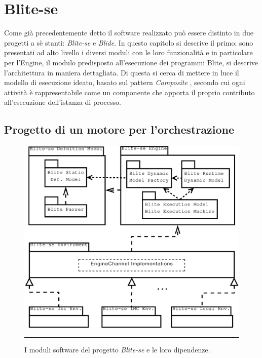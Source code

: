 \chapter{Blite-se}

Come già precedentemente detto il software realizzato può essere distinto
in due progetti a sè stanti: \emph{Blite-se} e \emph{Blide}. In questo capitolo
si descrive il primo; sono presentati ad alto livello i diversi
moduli con le loro funzionalità e in particolare per l'Engine, il modulo predisposto all'esecuzione dei programmi
Blite, si descrive l'architettura in maniera dettagliata. Di questa si cerca di
mettere in luce il modello di esecuzione ideato, basato sul pattern
\emph{Composite} \cite{GANGo4}, secondo cui ogni attività è rappresentabile
come un componente che apporta il proprio contributo all'esecuzione dell'istanza di processo.

\section{Progetto di un motore per l'orchestrazione}
\label{sec:progmot}
\begin{figure}[t]
\begin{center}
\includegraphics[scale=0.50]
{architettura_interna/dia/BliteModule}
\caption[I moduli di Blite-se] {I moduli software del progetto \emph{Blite-se}
e le loro dipendenze.}
\rule{7cm}{0.01cm}
  \label{fig:modules}
\end{center}
\end{figure}

